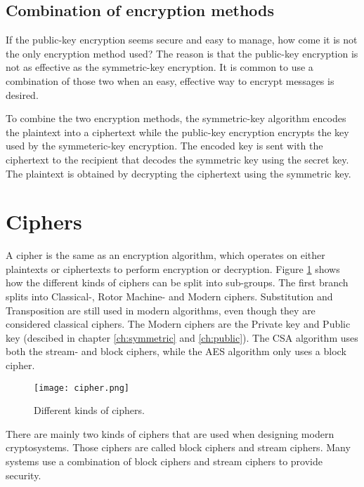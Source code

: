\subsection{Combination of encryption methods}
If the public-key encryption seems secure and easy to manage, how 
come it is not the only encryption method used? The reason is that the 
public-key encryption is not as effective as the symmetric-key 
encryption. It is common to use a combination of those two when 
an easy, effective way to encrypt messages is desired.

To combine the two encryption methods, the symmetric-key algorithm 
encodes the plaintext into a ciphertext while the public-key 
encryption encrypts the key used by the symmeteric-key encryption. The 
encoded key is sent with the ciphertext to the recipient that decodes 
the symmetric key using the secret key. The plaintext is obtained by 
decrypting the ciphertext using the symmetric key.


\section{Ciphers}
A cipher is the same as an encryption algorithm, which operates on 
either plaintexts or ciphertexts to perform encryption or decryption. 
Figure \ref{img:ciphers} shows how the different kinds of ciphers 
can be split into sub-groups. The first branch splits into Classical-, 
Rotor Machine- and Modern ciphers. Substitution and Transposition are 
still used in modern algorithms, even though they are considered 
classical ciphers. The Modern ciphers are the Private 
key and Public key (descibed in chapter \ref{ch:symmetric} and 
\ref{ch:public}). The CSA algorithm uses both the stream- and block 
ciphers, while the AES algorithm only uses a block cipher.

\begin{figure}
  \texttt{[image: cipher.png]}
  \caption{Different kinds of ciphers. \citep{CipherTax:2013}}
  \label{img:ciphers}
\end{figure}

There are mainly two kinds of ciphers that are used when designing 
modern cryptosystems. Those ciphers are called block ciphers and 
stream ciphers. Many systems use a combination of block ciphers and 
stream ciphers to provide security. 

